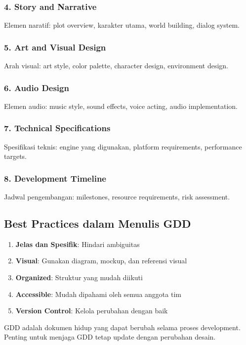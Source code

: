 \subsubsection{4. Story and Narrative}
Elemen naratif: plot overview, karakter utama, world building, dialog system.

\subsubsection{5. Art and Visual Design}
Arah visual: art style, color palette, character design, environment design.

\subsubsection{6. Audio Design}
Elemen audio: music style, sound effects, voice acting, audio implementation.

\subsubsection{7. Technical Specifications}
Spesifikasi teknis: engine yang digunakan, platform requirements, performance targets.

\subsubsection{8. Development Timeline}
Jadwal pengembangan: milestones, resource requirements, risk assessment.

\subsection{Best Practices dalam Menulis GDD}

\begin{enumerate}
\item \textbf{Jelas dan Spesifik}: Hindari ambiguitas
\item \textbf{Visual}: Gunakan diagram, mockup, dan referensi visual
\item \textbf{Organized}: Struktur yang mudah diikuti
\item \textbf{Accessible}: Mudah dipahami oleh semua anggota tim
\item \textbf{Version Control}: Kelola perubahan dengan baik
\end{enumerate}

\begin{catatan}
GDD adalah dokumen hidup yang dapat berubah selama proses development. Penting untuk menjaga GDD tetap update dengan perubahan desain.
\end{catatan}
